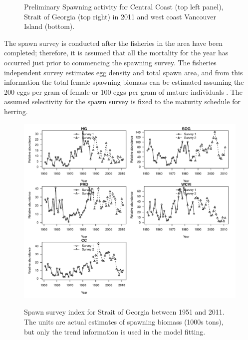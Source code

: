 \begin{figure}[!tbp]
	\caption{Preliminary Spawning activity for Central Coast (top left panel), Strait of Georgia (top right) in 2011 and west coast Vancouver Island (bottom).}\label{figSpawnMaps}
\end{figure}

	The spawn survey is conducted after the fisheries in the area have been completed; therefore, it is assumed that all the mortality for the year has occurred just prior to commencing the spawning survey. The fisheries independent survey estimates egg density and total spawn area, and from this information the total female spawning biomass can be estimated assuming the 200 eggs per gram of female  or 100 eggs per gram of mature  individuals \citep{hay1985reproductive,hardwick1973biomass}. The assumed selectivity for the spawn survey is fixed to the maturity schedule for herring.  	
	
\begin{figure}[!tbp]
	\includegraphics[width=\textwidth]{../Figs/iscam_fig_SurveyMajorAreas.pdf}\\
	\caption{Spawn survey index for Strait of Georgia between 1951 and 2011. The units are actual estimates of spawning biomass (1000s tons), but only the trend information is used in the model fitting.}\label{FigSurvey}
\end{figure}
	
